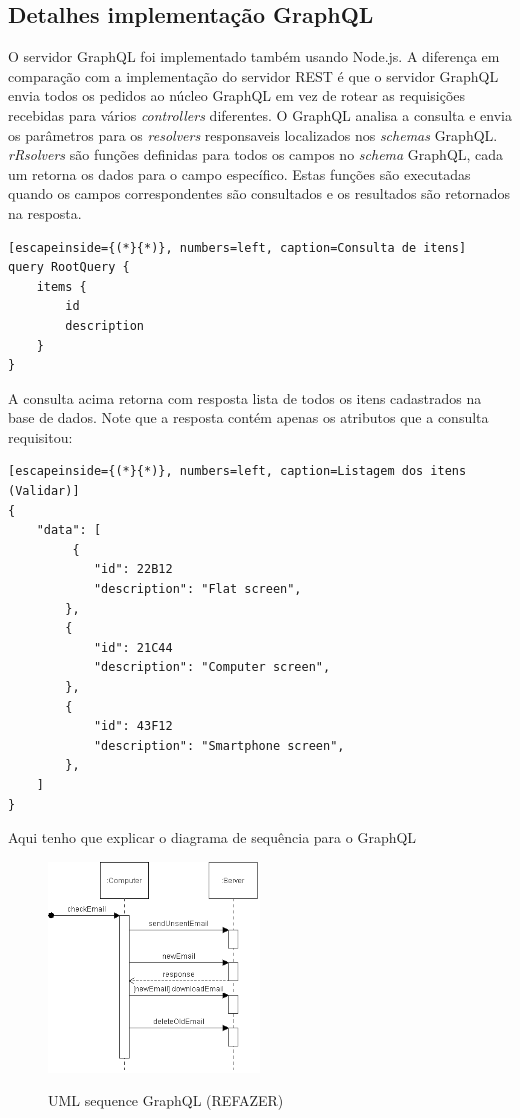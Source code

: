 \subsection{Detalhes implementação GraphQL}

O servidor GraphQL foi implementado também usando Node.js. A diferença em comparação com a implementação do servidor REST é que o servidor GraphQL envia todos os pedidos ao núcleo GraphQL em vez de rotear as requisições recebidas para vários \textit{controllers} diferentes. O GraphQL analisa a consulta e envia os parâmetros para os \textit{resolvers} responsaveis localizados nos \textit{schemas} GraphQL. \textit{rRsolvers} são funções definidas para todos os campos no \textit{schema} GraphQL, cada um retorna os dados para o campo específico. Estas funções são executadas quando os campos correspondentes são consultados e os resultados são retornados na resposta.

\begin{lstlisting}[escapeinside={(*}{*)}, numbers=left, caption=Consulta de itens]
query RootQuery {
	items {
    	id
    	description
    }
}

\end{lstlisting}

A consulta acima retorna com resposta lista de todos os itens cadastrados na base de dados. Note que a resposta contém apenas os atributos que a consulta requisitou: 

\begin{lstlisting}[escapeinside={(*}{*)}, numbers=left, caption=Listagem dos itens (Validar)]
{
    "data": [
         {
        	"id": 22B12
            "description": "Flat screen",
        },
        {
        	"id": 21C44
            "description": "Computer screen",
        },
        {
        	"id": 43F12
            "description": "Smartphone screen",
        },
    ]
}

\end{lstlisting}

Aqui tenho que explicar o diagrama de sequência para o GraphQL

\begin{figure}[htbp]
\centering
\includegraphics[width=0.5\textwidth]{figuras/uml-sequence.png}
\label{fig:graph-uml}
\caption{UML sequence GraphQL (REFAZER)}
\author{fonte: Autor}
\end{figure}
\pagebreak


